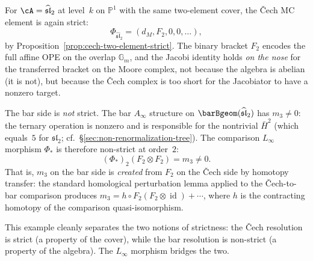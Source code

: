 \begin{example}
\label{ex:cech-hca-sl2}
For $\cA = \widehat{\mathfrak{sl}}_2$ at level~$k$ on
$\mathbb{P}^1$ with the same two-element cover, the \v{C}ech
MC element is again strict:
\[
\Phi_{\widehat{\mathfrak{sl}}_2}
 = (d_M, F_2, 0, 0, \ldots),
\]
by Proposition~\ref{prop:cech-two-element-strict}. The binary bracket
$F_2$ encodes the full affine OPE on the overlap
$\mathbb{G}_m$, and the Jacobi identity holds \emph{on the nose}
for the transferred bracket on the Moore complex, not because the
algebra is abelian (it is not), but because the \v{C}ech complex
is too short for the Jacobiator to have a nonzero target.

The bar side is \emph{not} strict. The
bar $A_\infty$ structure on $\barBgeom(\widehat{\mathfrak{sl}}_2)$
has $m_3 \neq 0$: the ternary operation is nonzero and is
responsible for the nontrivial $\bar{H}^2$ (which equals~$5$ for
$\mathfrak{sl}_2$; cf.\ \S\ref{sec:non-renormalization-tree}).
The comparison $L_\infty$ morphism $\Phi_*$ is therefore
non-strict at order~$2$:
\[
(\Phi_*)_2(F_2 \otimes F_2) = m_3 \neq 0.
\]
That is, $m_3$ on the bar side is \emph{created} from $F_2$ on the
\v{C}ech side by homotopy transfer: the standard homological
perturbation lemma applied to the \v{C}ech-to-bar comparison
produces $m_3 = h \circ F_2(F_2 \otimes \operatorname{id}) +
\cdots$, where $h$ is the contracting homotopy of the comparison
quasi-isomorphism.

This example cleanly separates the two notions of strictness:
the \v{C}ech resolution is strict (a property of the cover), while
the bar resolution is non-strict (a property of the algebra).
The $L_\infty$ morphism bridges the two.
\end{example}

